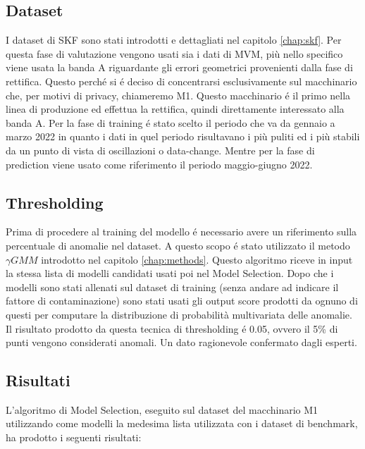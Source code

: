 \subsection{Dataset}
I dataset di SKF sono stati introdotti e dettagliati nel capitolo \ref{chap:skf}. Per questa fase di valutazione vengono usati sia i dati di MVM, più nello specifico viene usata la banda A riguardante gli errori geometrici provenienti dalla fase di rettifica. Questo perché si é deciso di concentrarsi esclusivamente sul macchinario che, per motivi di privacy, chiameremo M1. Questo macchinario é il primo nella linea di produzione ed effettua la rettifica, quindi direttamente interessato alla banda A.
Per la fase di training é stato scelto il periodo che va da gennaio a marzo 2022 in quanto i dati in quel periodo risultavano i più puliti ed i più stabili da un punto di vista di oscillazioni o data-change. Mentre per la fase di prediction viene usato come riferimento il periodo maggio-giugno 2022.



\subsection{Thresholding}
Prima di procedere al training del modello é necessario avere un riferimento sulla percentuale di anomalie nel dataset. A questo scopo é stato utilizzato il metodo ${\gamma}GMM$ introdotto nel capitolo \ref{chap:methods}.
Questo algoritmo riceve in input la stessa lista di modelli candidati usati poi nel Model Selection. Dopo che i modelli sono stati allenati sul dataset di training (senza andare ad indicare il fattore di contaminazione) sono stati usati gli output score prodotti da ognuno di questi per computare la distribuzione di probabilità multivariata delle anomalie.
Il risultato prodotto da questa tecnica di thresholding é 0.05, ovvero il 5\% di punti vengono considerati anomali. Un dato ragionevole confermato dagli esperti.


\subsection{Risultati}
L'algoritmo di Model Selection, eseguito sul dataset del macchinario M1 utilizzando come modelli la medesima lista utilizzata con i dataset di benchmark, ha prodotto i seguenti risultati:


